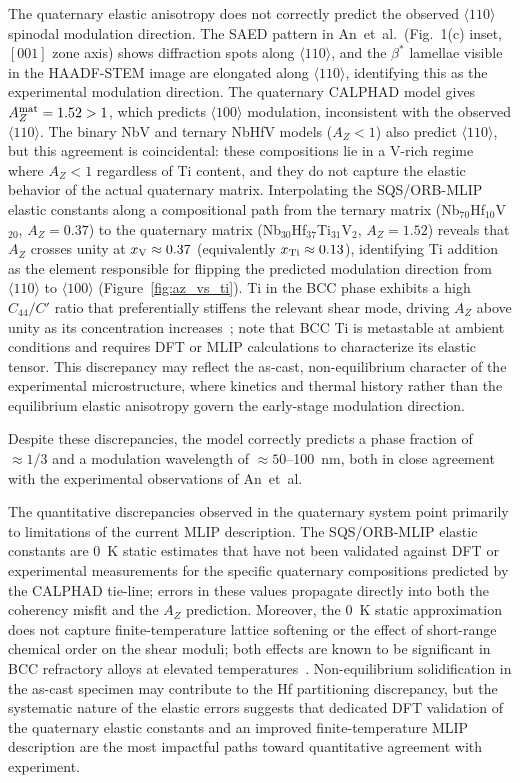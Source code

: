 {The quaternary elastic anisotropy does not correctly predict the observed $\langle 110 \rangle$ spinodal modulation direction.
The SAED pattern in An~et~al.\ (Fig.~1(c) inset, $[001]$ zone axis) shows diffraction spots along $\langle 110 \rangle$, and the $\beta^*$ lamellae visible in the HAADF-STEM image are elongated along $\langle 110 \rangle$, identifying this as the experimental modulation direction.
The quaternary CALPHAD model gives $A_Z^{\rm mat} = 1.52 > 1$, which predicts $\langle 100 \rangle$ modulation, inconsistent with the observed $\langle 110 \rangle$.
The binary NbV and ternary NbHfV models ($A_Z < 1$) also predict $\langle 110 \rangle$, but this agreement is coincidental: these compositions lie in a V-rich regime where $A_Z < 1$ regardless of Ti content, and they do not capture the elastic behavior of the actual quaternary matrix.
Interpolating the SQS/ORB-MLIP elastic constants along a compositional path from the ternary matrix (Nb$_{70}$Hf$_{10}$V$_{20}$, $A_Z = 0.37$) to the quaternary matrix (Nb$_{30}$Hf$_{37}$Ti$_{31}$V$_{2}$, $A_Z = 1.52$) reveals that $A_Z$ crosses unity at $x_{\rm V} \approx 0.37$ (equivalently $x_{\rm Ti} \approx 0.13$), identifying Ti addition as the element responsible for flipping the predicted modulation direction from $\langle 110 \rangle$ to $\langle 100 \rangle$ (Figure~\ref{fig:az_vs_ti}).
Ti in the BCC phase exhibits a high $C_{44}/C'$ ratio that preferentially stiffens the relevant shear mode, driving $A_Z$ above unity as its concentration increases~\cite{}; note that BCC Ti is metastable at ambient conditions and requires DFT or MLIP calculations to characterize its elastic tensor.
This discrepancy may reflect the as-cast, non-equilibrium character of the experimental microstructure, where kinetics and thermal history rather than the equilibrium elastic anisotropy govern the early-stage modulation direction.

Despite these discrepancies, the model correctly predicts a phase fraction of $\approx 1/3$ and a modulation wavelength of ${\approx}50$--\SI{100}{\nano\metre}, both in close agreement with the experimental observations of An~et~al.

The quantitative discrepancies observed in the quaternary system point primarily to limitations of the current MLIP description.
The SQS/ORB-MLIP elastic constants are 0~K static estimates that have not been validated against DFT or experimental measurements for the specific quaternary compositions predicted by the CALPHAD tie-line; errors in these values propagate directly into both the coherency misfit and the $A_Z$ prediction.
Moreover, the 0~K static approximation does not capture finite-temperature lattice softening or the effect of short-range chemical order on the shear moduli; both effects are known to be significant in BCC refractory alloys at elevated temperatures~\cite{}.
Non-equilibrium solidification in the as-cast specimen may contribute to the Hf partitioning discrepancy, but the systematic nature of the elastic errors suggests that dedicated DFT validation of the quaternary elastic constants and an improved finite-temperature MLIP description are the most impactful paths toward quantitative agreement with experiment.
}

